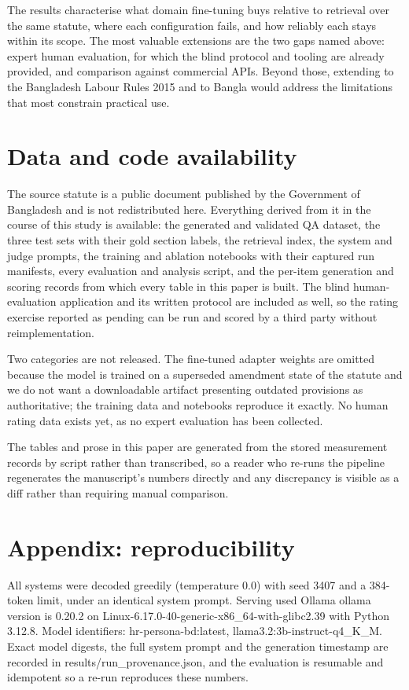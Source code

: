 \documentclass[11pt,a4paper]{article}
\begin{document}
The results characterise what domain fine-tuning buys relative to retrieval over the same statute, where each configuration fails, and how reliably each stays within its scope. The most valuable extensions are the two gaps named above: expert human evaluation, for which the blind protocol and tooling are already provided, and comparison against commercial APIs. Beyond those, extending to the Bangladesh Labour Rules 2015 and to Bangla would address the limitations that most constrain practical use.
\section*{Data and code availability}
The source statute is a public document published by the Government of Bangladesh\cite{ref_act} and is not redistributed here. Everything derived from it in the course of this study is available: the generated and validated QA dataset, the three test sets with their gold section labels, the retrieval index, the system and judge prompts, the training and ablation notebooks with their captured run manifests, every evaluation and analysis script, and the per-item generation and scoring records from which every table in this paper is built. The blind human-evaluation application and its written protocol are included as well, so the rating exercise reported as pending can be run and scored by a third party without reimplementation.

Two categories are not released. The fine-tuned adapter weights are omitted because the model is trained on a superseded amendment state of the statute and we do not want a downloadable artifact presenting outdated provisions as authoritative; the training data and notebooks reproduce it exactly. No human rating data exists yet, as no expert evaluation has been collected.

The tables and prose in this paper are generated from the stored measurement records by script rather than transcribed, so a reader who re-runs the pipeline regenerates the manuscript's numbers directly and any discrepancy is visible as a diff rather than requiring manual comparison.
\section*{Appendix: reproducibility}
All systems were decoded greedily (temperature 0.0) with seed 3407 and a 384-token limit, under an identical system prompt. Serving used Ollama ollama version is 0.20.2 on Linux-6.17.0-40-generic-x86\_64-with-glibc2.39 with Python 3.12.8. Model identifiers: hr-persona-bd:latest, llama3.2:3b-instruct-q4\_K\_M. Exact model digests, the full system prompt and the generation timestamp are recorded in results/run\_provenance.json, and the evaluation is resumable and idempotent so a re-run reproduces these numbers.
\end{document}
